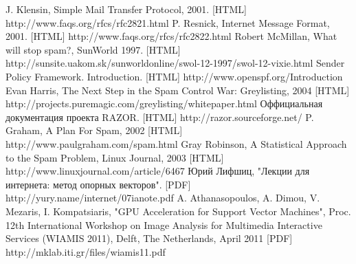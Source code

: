 \newpage
\begin{thebibliography}{99}
 J. Klensin, Simple Mail Transfer Protocol, 2001. [HTML] http://www.faqs.org/rfcs/rfc2821.html 
 P. Resnick, Internet Message Format, 2001. [HTML] http://www.faqs.org/rfcs/rfc2822.html
 Robert McMillan, What will stop spam?, SunWorld 1997. [HTML] http://sunsite.uakom.sk/sunworldonline/swol-12-1997/swol-12-vixie.html
 Sender Policy Framework. Introduction.  [HTML] http://www.openspf.org/Introduction
 Evan Harris, The Next Step in the Spam Control War: Greylisting, 2004 [HTML] http://projects.puremagic.com/greylisting/whitepaper.html
 Оффициальная документация проекта RAZOR. [HTML] http://razor.sourceforge.net/
 P. Graham, A Plan For Spam, 2002 [HTML] http://www.paulgraham.com/spam.html
 Gray Robinson, A Statistical Approach to the Spam Problem, Linux Journal, 2003 [HTML] http://www.linuxjournal.com/article/6467 
 Юрий Лифшиц, "Лекции для интернета: метод опорных векторов". [PDF] http://yury.name/internet/07ianote.pdf
A. Athanasopoulos, A. Dimou, V. Mezaris, I. Kompatsiaris, "GPU Acceleration for Support Vector Machines", Proc. 12th International Workshop on Image Analysis for Multimedia Interactive Services (WIAMIS 2011), Delft, The Netherlands, April 2011 [PDF] http://mklab.iti.gr/files/wiamis11.pdf
\end{thebibliography}
